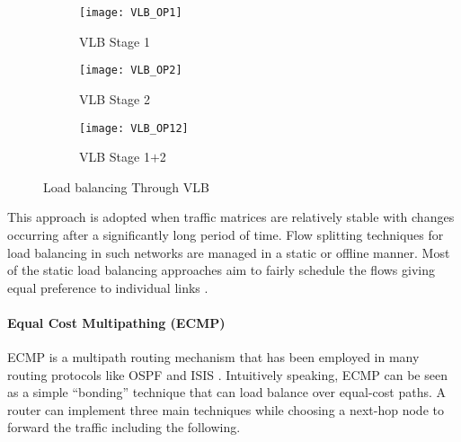 \documentclass[10pt]{IEEEtran}
\begin{document}
\begin{figure*}
\centering
 \begin{subfigure}[ht!]{0.3\textwidth}
                \texttt{[image: VLB\_OP1]}
                \caption{VLB Stage 1}
                \label{fig:vlbs1}
        \end{subfigure}\begin{subfigure}[ht!]{0.33\textwidth}
                \texttt{[image: VLB\_OP2]}
                \caption{VLB Stage 2}
                \label{fig:vlbs2}
        \end{subfigure}
        \begin{subfigure}[ht!]{0.32\textwidth}
                \texttt{[image: VLB\_OP12]}
                \caption{VLB Stage 1$+$2}
                \label{fig:vlbs12}
        \end{subfigure}
        \caption{Load balancing Through VLB}\label{fig:vlb}

\end{figure*}

This approach is adopted when traffic matrices are relatively stable with changes occurring after a significantly long period of time. Flow splitting techniques for load balancing in such networks are managed in a static or offline manner. Most of the static load balancing approaches aim to fairly schedule the flows giving equal preference to individual links \cite{shreedhar1995efficient}.

 \vspace{2mm}
\paragraph{Equal Cost Multipathing (ECMP)}
\label{subsubsec:ecmp}

ECMP \cite{moy1998ospf, hopps2000multipath, hopps2000analysis} is a multipath routing mechanism that has been employed in many routing protocols like OSPF and ISIS \cite{villamizar1999ospf, fortz2000internet}. Intuitively speaking, ECMP can be seen as a simple ``bonding'' technique that can load balance over equal-cost paths. A router can implement three main techniques while choosing a next-hop node to forward the traffic including the following.
\end{document}
